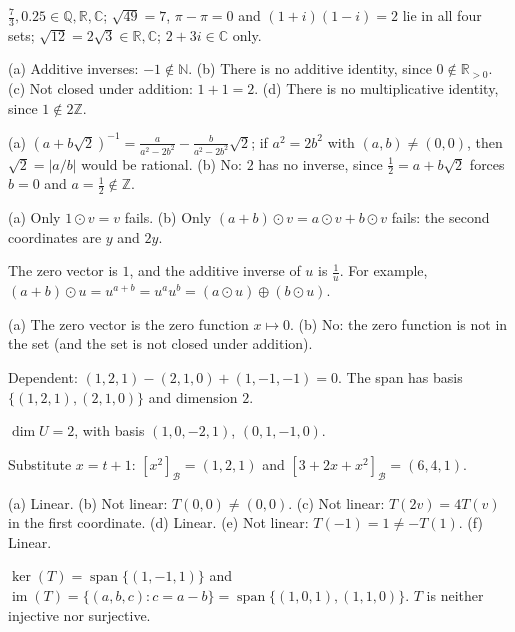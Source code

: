 \documentclass[11pt]{article}
\theoremstyle{definition}
\DeclareMathOperator{\im}{im}
\DeclareMathOperator{\Span}{span}
\begin{document}
\begin{description}[leftmargin=0pt, itemsep=0.3em]
    \item[\ref{pr:numbers}.] $\frac{7}{3}, 0.25 \in \mathbb{Q}, \mathbb{R}, \mathbb{C}$; $\sqrt{49} = 7$, $\pi - \pi = 0$ and $(1 + i)(1 - i) = 2$ lie in all four sets; $\sqrt{12} = 2\sqrt{3} \in \mathbb{R}, \mathbb{C}$; $2 + 3i \in \mathbb{C}$ only.
    \item[\ref{pr:field-fail}.] (a) Additive inverses: $-1 \notin \mathbb{N}$. (b) There is no additive identity, since $0 \notin \mathbb{R}_{>0}$. (c) Not closed under addition: $1 + 1 = 2$. (d) There is no multiplicative identity, since $1 \notin 2\mathbb{Z}$.
    \item[\ref{pr:Qsqrt2}.] (a) $(a + b\sqrt{2})^{-1} = \frac{a}{a^2 - 2b^2} - \frac{b}{a^2 - 2b^2}\sqrt{2}$; if $a^2 = 2b^2$ with $(a, b) \neq (0, 0)$, then $\sqrt{2} = |a/b|$ would be rational. (b) No: $2$ has no inverse, since $\frac{1}{2} = a + b\sqrt{2}$ forces $b = 0$ and $a = \frac{1}{2} \notin \mathbb{Z}$.
    \item[\ref{pr:weird-ops}.] (a) Only $1 \odot v = v$ fails. (b) Only $(a + b) \odot v = a \odot v + b \odot v$ fails: the second coordinates are $y$ and $2y$.
    \item[\ref{pr:positive-reals}.] The zero vector is $1$, and the additive inverse of $u$ is $\frac{1}{u}$. For example, $(a + b) \odot u = u^{a + b} = u^a u^b = (a \odot u) \oplus (b \odot u)$.
    \item[\ref{pr:functions}.] (a) The zero vector is the zero function $x \mapsto 0$. (b) No: the zero function is not in the set (and the set is not closed under addition).
    \item[\ref{pr:indep}.] Dependent: $(1, 2, 1) - (2, 1, 0) + (1, -1, -1) = 0$. The span has basis $\{(1, 2, 1), (2, 1, 0)\}$ and dimension $2$.
    \item[\ref{pr:basisU}.] $\dim U = 2$, with basis $(1, 0, -2, 1)$, $(0, 1, -1, 0)$.
    \item[\ref{pr:taylor-basis}.] Substitute $x = t + 1$: $[x^2]_{\mathcal{B}} = (1, 2, 1)$ and $[3 + 2x + x^2]_{\mathcal{B}} = (6, 4, 1)$.
    \item[\ref{pr:linear}.] (a) Linear. (b) Not linear: $T(0, 0) \neq (0, 0)$. (c) Not linear: $T(2v) = 4T(v)$ in the first coordinate. (d) Linear. (e) Not linear: $T(-1) = 1 \neq -T(1)$. (f) Linear.
    \item[\ref{pr:kerim}.] $\ker(T) = \Span\{(1, -1, 1)\}$ and $\im(T) = \{(a, b, c) : c = a - b\} = \Span\{(1, 0, 1), (1, 1, 0)\}$. $T$ is neither injective nor surjective.

\end{description}
\end{document}
